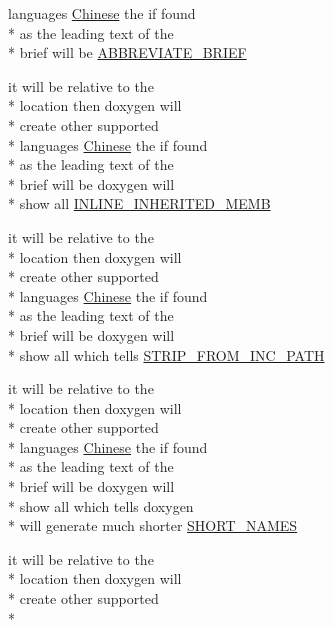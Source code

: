 \begin{DoxyCompactItemize}
languages \hyperlink{mkdoc_8dox_ab6ff97d2e5e9fa61c208d5f0eee91c62}{Chinese} the if found \\*
as the leading text of the \\*
brief will be \hyperlink{mkdoc_8dox_a122d2428a3db9b3f12d65d76f35275b8}{A\-B\-B\-R\-E\-V\-I\-A\-T\-E\-\_\-\-B\-R\-I\-E\-F}
\item 
it will be relative to the \\*
location then doxygen will \\*
create other supported \\*
languages \hyperlink{mkdoc_8dox_ab6ff97d2e5e9fa61c208d5f0eee91c62}{Chinese} the if found \\*
as the leading text of the \\*
brief will be doxygen will \\*
show all \hyperlink{mkdoc_8dox_a917faf68b4323d3cbd972106282ca4e7}{I\-N\-L\-I\-N\-E\-\_\-\-I\-N\-H\-E\-R\-I\-T\-E\-D\-\_\-\-M\-E\-M\-B}
\item 
it will be relative to the \\*
location then doxygen will \\*
create other supported \\*
languages \hyperlink{mkdoc_8dox_ab6ff97d2e5e9fa61c208d5f0eee91c62}{Chinese} the if found \\*
as the leading text of the \\*
brief will be doxygen will \\*
show all which tells \hyperlink{mkdoc_8dox_a6d297e0f2850b59accd7903a23e2ecff}{S\-T\-R\-I\-P\-\_\-\-F\-R\-O\-M\-\_\-\-I\-N\-C\-\_\-\-P\-A\-T\-H}
\item 
it will be relative to the \\*
location then doxygen will \\*
create other supported \\*
languages \hyperlink{mkdoc_8dox_ab6ff97d2e5e9fa61c208d5f0eee91c62}{Chinese} the if found \\*
as the leading text of the \\*
brief will be doxygen will \\*
show all which tells doxygen \\*
will generate much shorter \hyperlink{mkdoc_8dox_a8b98f3c06d38ae31f6e77655f4e4bf0a}{S\-H\-O\-R\-T\-\_\-\-N\-A\-M\-E\-S}
\item 
it will be relative to the \\*
location then doxygen will \\*
create other supported \\*

\end{DoxyCompactItemize}
